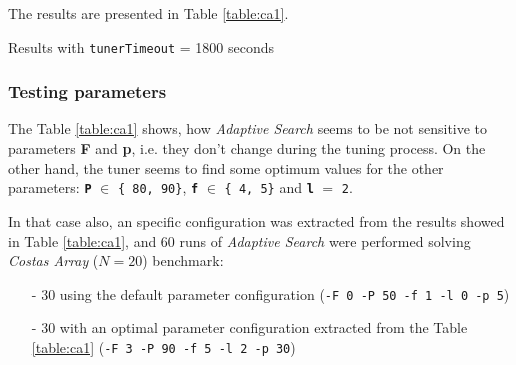 The results are presented in Table \ref{table:ca1}.

\begin{table} 
\caption{Results with \texttt{tunerTimeout} = 1800 seconds}
\centering 
\renewcommand{\arraystretch}{1.2}
\label{table:ca1}
\end{table}

\subsubsection{ Testing parameters}

The Table \ref{table:ca1} shows, how {\it Adaptive Search} seems to be not sensitive to parameters {\bf F} and {\bf p}, i.e. they don't change during the tuning process. On the other hand, the tuner seems to find some optimum values for the other parameters: \texttt{\bf P} $\in$ \texttt{\{ 80, 90\}}, \texttt{\bf f} $\in$ \texttt{\{ 4, 5\}} and \texttt{\bf l} $=$ \texttt{2}.

In that case also, an specific configuration was extracted from the results showed in Table \ref{table:ca1}, and 60 runs of {\it Adaptive Search} were performed solving {\it Costas Array} ($N = 20$) benchmark: 
\begin{itemize}
	\item[-] 30 using the default parameter configuration (\texttt{-F 0 -P 50 -f 1 -l 0 -p 5})
	\item[-] 30 with an optimal parameter configuration extracted from the Table \ref{table:ca1} (\texttt{-F 3 -P 90 -f 5 -l 2 -p 30}) 
\end{itemize}

